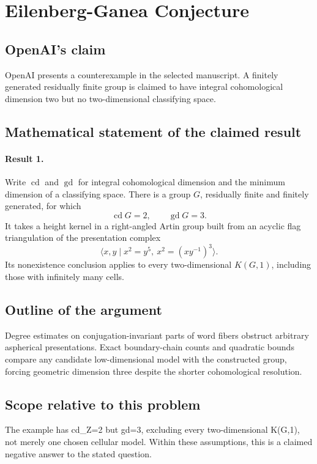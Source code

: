 \documentclass[11pt]{article}
\begin{document}
\section*{Eilenberg-Ganea Conjecture}

\subsection{OpenAI's claim}
OpenAI presents a counterexample in the selected manuscript. A finitely generated residually finite group is claimed to have integral cohomological dimension two but no two-dimensional classifying space.

\subsection{Mathematical statement of the claimed result}
\paragraph{Result 1.} Write \(\operatorname{cd}\) and \(\operatorname{gd}\) for integral cohomological dimension and the minimum dimension of a classifying space. There is a group \(G\), residually finite and finitely generated, for which
\[
 \operatorname{cd}G=2,\qquad\operatorname{gd}G=3.
\]
It takes a height kernel in a right-angled Artin group built from an acyclic flag triangulation of the presentation complex
\[
 \langle x,y\mid x^2=y^5,\ x^2=(xy^{-1})^3\rangle.
\]
Its nonexistence conclusion applies to every two-dimensional \(K(G,1)\), including those with infinitely many cells.

\subsection{Outline of the argument}
Degree estimates on conjugation-invariant parts of word fibers obstruct arbitrary aspherical presentations. Exact boundary-chain counts and quadratic bounds compare any candidate low-dimensional model with the constructed group, forcing geometric dimension three despite the shorter cohomological resolution.

\subsection{Scope relative to this problem}
The example has cd\_Z=2 but gd=3, excluding every two-dimensional K(G,1), not merely one chosen cellular model. Within these assumptions, this is a claimed negative answer to the stated question.
\end{document}
